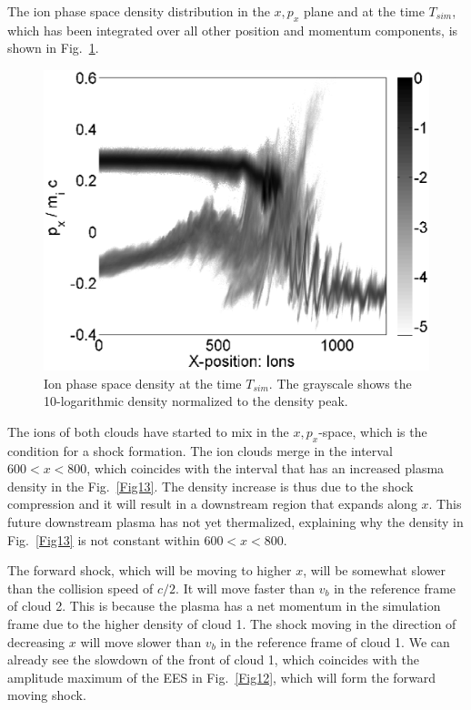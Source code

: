 \documentclass[structabstract]{aa}
\begin{document}
The ion phase space density distribution in the $x,p_x$ plane and at the
time $T_{sim}$, which has been integrated over all other position and momentum 
components, is shown in Fig.~\ref{Fig14}. 
\begin{figure}
\centering
\includegraphics[width=\columnwidth]{Fig14.eps}
\caption{Ion phase space density at the time $T_{sim}$. The grayscale shows the 
10-logarithmic density normalized to the density peak.}
\label{Fig14}
\end{figure}
The ions of both clouds have started to mix in the $x,p_x$-space, which is 
the condition for a shock formation. The ion clouds merge in the interval 
$600 < x < 800$, which coincides with the interval that has an increased 
plasma density in the Fig.~\ref{Fig13}. The density increase is thus due 
to the shock compression and it will result in a downstream region that 
expands along $x$. This future downstream plasma has not yet thermalized, 
explaining why the density in Fig.~\ref{Fig13} is not constant within 
$600 < x < 800$. 

The forward shock, which will be moving to higher $x$, will be somewhat 
slower than the collision speed of $c/2$. It will move faster than $v_b$ 
in the reference frame of cloud 2. This is because the plasma has a net 
momentum in the simulation frame due to the higher density of cloud 1. 
The shock moving in the direction of decreasing $x$ will move slower than 
$v_b$ in the reference frame of cloud 1. We can already see the slowdown 
of the front of cloud 1, which coincides with the amplitude maximum of
the EES in Fig.~\ref{Fig12}, which will form the forward moving shock. 
\end{document}

